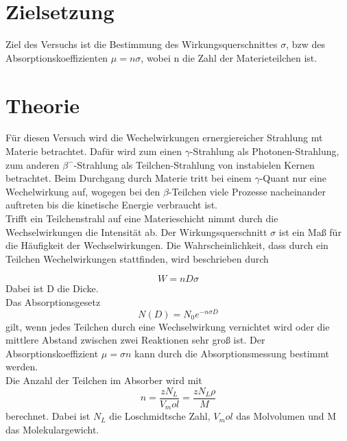 


\section{Zielsetzung}
Ziel des Versuchs ist die Bestimmung des Wirkungsquerschnittes $\sigma$,
bzw des Absorptionskoeffizienten $\mu = n\sigma$, wobei n die Zahl der Materieteilchen ist.
\section{Theorie}
Für diesen Versuch wird die Wechelwirkungen ernergiereicher Strahlung mt Materie betrachtet.
Dafür wird zum einen $\gamma$-Strahlung als Photonen-Strahlung,
zum anderen $\beta^-$-Strahlung als Teilchen-Strahlung von instabielen Kernen betrachtet.
Beim Durchgang durch Materie tritt bei einem $\gamma$-Quant nur eine Wechelwirkung auf,
wogegen bei den $\beta$-Teilchen viele Prozesse nacheinander auftreten bis die kinetische Energie verbraucht ist.\\
Trifft ein Teilchenstrahl auf eine Materieschicht nimmt durch die Wechselwirkungen die Intensität ab.
Der Wirkungsquerschnitt $\sigma$ ist ein Maß für die Häufigkeit der Wechselwirkungen.
Die Wahrscheinlichkeit, dass durch ein Teilchen Wechelwirkungen stattfinden, wird beschrieben durch

\begin{equation}
  W = nD\sigma
\end{equation}
Dabei ist D die Dicke.\\
Das Absorptionsgesetz
\begin{equation}
  N(D)= N_0 e^{-n\sigma D}
\end{equation}
gilt, wenn jedes Teilchen durch eine Wechselwirkung vernichtet wird oder
die mittlere Abstand zwischen zwei Reaktionen sehr groß ist.
Der Absorptionskoeffizient $\mu = \sigma n$ kann durch die Absorptionsmessung bestimmt werden.\\
Die Anzahl der Teilchen im Absorber wird mit
\begin{equation}
  n = \frac{zN_L}{V_mol} = \frac{zN_L\rho}{M}
\end{equation}
berechnet.
Dabei ist $N_L$ die Loschmidtsche Zahl, $V_mol$ das Molvolumen und M das Molekulargewicht.


